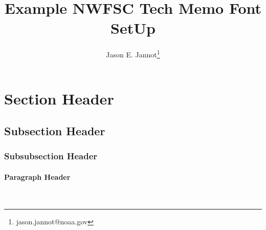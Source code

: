 \documentclass[12pt]{article}
\title{\textcolor[cmyk]{1.00,0.83,0.41,0.36}{Example NWFSC Tech Memo Font SetUp}}
\author{Jason E. Jannot\footnote{jason.jannot@noaa.gov}}
\newcommand{\paragraphnewline}[1]{\paragraph{#1}\mbox{}\\}
\begin{document}
\maketitle
\selectfont
\normalsize


\section{Section Header}
\lipsum[1]
\subsection{Subsection Header}
\lipsum[2]
\subsubsection{Subsubsection Header}
\lipsum[3]
\paragraphnewline{Paragraph Header}
\lipsum[4]
\end{document}
